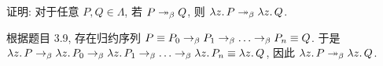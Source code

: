 \begin{problem}
证明: 对于任意 $P, Q \in \Lambda$, 若 $P \twoheadrightarrow_\beta Q$, 则 $\lambda {z}.\,{P} \twoheadrightarrow_\beta \lambda {z}.\,{Q}$.
\end{problem}

\begin{solution}
根据题目 3.9, 存在归约序列 $P \equiv P_0 \sreduceto P_1 \sreduceto \dots \sreduceto P_n \equiv Q$. 于是 $\lambdabstract{z}{P} \sreduceto \lambdabstract{z}{P_0} \sreduceto \lambdabstract{z}{P_1} \sreduceto \dots \sreduceto \lambdabstract{z}{P_n} \equiv \lambdabstract{z}{Q}$, 因此 $\lambda {z}.\,{P} \twoheadrightarrow_\beta \lambda {z}.\,{Q}$.
\end{solution}
